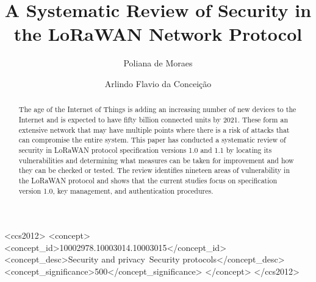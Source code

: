\documentclass[manuscript,screen,review=false]{acmart}
\begin{document}
\title{A Systematic Review of Security in the LoRaWAN Network Protocol}

\author{Poliana de Moraes}

\author{Arlindo Flavio da Conceição}


\begin{abstract}
  The age of the Internet of Things is adding an increasing number of new devices to the Internet and is expected to have fifty billion connected units by 2021. These form an extensive network that may have multiple points where there is a risk of attacks that can compromise the entire system. This paper has conducted a systematic review of security in LoRaWAN protocol specification versions 1.0 and 1.1 by locating its vulnerabilities and determining what measures can be taken for improvement and how they can be checked or tested. The review identifies nineteen areas of vulnerability in the LoRaWAN protocol and shows that the current studies focus on specification version 1.0, key management, and authentication procedures.
\end{abstract}


\begin{CCSXML}
<ccs2012>
<concept>
<concept_id>10002978.10003014.10003015</concept_id>
<concept_desc>Security and privacy~Security protocols</concept_desc>
<concept_significance>500</concept_significance>
</concept>
</ccs2012>
\end{CCSXML}
\end{document}

